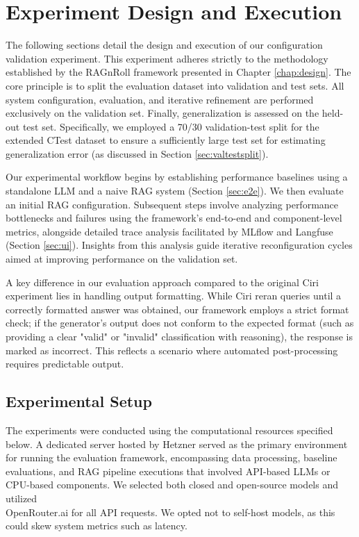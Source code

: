 \section{Experiment Design and Execution} \label{sec:exp_design_exec}
The following sections detail the design and execution of our configuration validation experiment. This experiment adheres strictly to the methodology established by the RAGnRoll framework presented in Chapter \ref{chap:design}. The core principle is to split the evaluation dataset into validation and test sets. All system configuration, evaluation, and iterative refinement are performed exclusively on the validation set. Finally, generalization is assessed on the held-out test set. Specifically, we employed a 70/30 validation-test split for the extended CTest dataset to ensure a sufficiently large test set for estimating generalization error (as discussed in Section \ref{sec:valtestsplit}).

Our experimental workflow begins by establishing performance baselines using a standalone LLM and a naive RAG system (Section \ref{sec:e2e}). We then evaluate an initial RAG configuration. Subsequent steps involve analyzing performance bottlenecks and failures using the framework's end-to-end and component-level metrics, alongside detailed trace analysis facilitated by MLflow and Langfuse (Section \ref{sec:ui}). Insights from this analysis guide iterative reconfiguration cycles aimed at improving performance on the validation set.

A key difference in our evaluation approach compared to the original Ciri experiment \cite{Lian.2024} lies in handling output formatting. While Ciri reran queries until a correctly formatted answer was obtained, our framework employs a strict format check; if the generator's output does not conform to the expected format (such as providing a clear "valid" or "invalid" classification with reasoning), the response is marked as incorrect. This reflects a scenario where automated post-processing requires predictable output.


\subsection{Experimental Setup} \label{sec:exp_setup}
The experiments were conducted using the computational resources specified below. A dedicated server hosted by Hetzner served as the primary environment for running the evaluation framework, encompassing data processing, baseline evaluations, and RAG pipeline executions that involved API-based LLMs or CPU-based components. We selected both closed and open-source models and utilized \\OpenRouter.ai \cite{openrouter-inc-2023} for all API requests. We opted not to self-host models, as this could skew system metrics such as latency.

